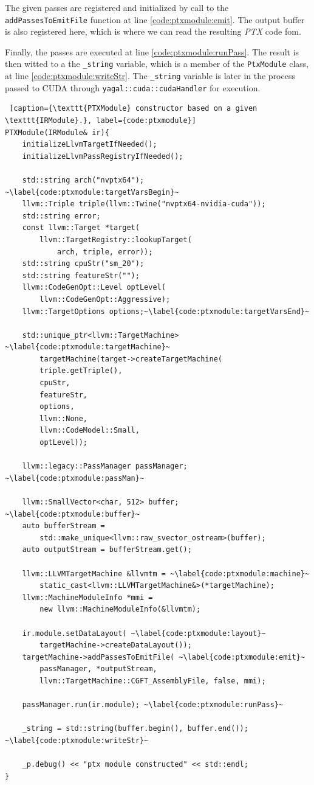The given passes are registered and initialized by call to the \texttt{addPassesToEmitFile} function at line \ref{code:ptxmodule:emit}. The output buffer is also registered here, which is where we can read the resulting \textit{PTX} code fom.

Finally, the passes are executed at line \ref{code:ptxmodule:runPass}. The result is then witted to a the \texttt{\_string} variable, which is a member of the \texttt{PtxModule} class, at line \ref{code:ptxmodule:writeStr}. The \texttt{\_string} variable is later in the process passed to CUDA through \texttt{yagal::cuda::cudaHandler} for execution.

\begin{lstlisting} [caption={\texttt{PTXModule} constructor based on a given \texttt{IRModule}.}, label={code:ptxmodule}]
PTXModule(IRModule& ir){
    initializeLlvmTargetIfNeeded();
    initializeLlvmPassRegistryIfNeeded();

    std::string arch("nvptx64"); ~\label{code:ptxmodule:targetVarsBegin}~
    llvm::Triple triple(llvm::Twine("nvptx64-nvidia-cuda"));
    std::string error;
    const llvm::Target *target(
        llvm::TargetRegistry::lookupTarget(
            arch, triple, error));
    std::string cpuStr("sm_20");
    std::string featureStr("");
    llvm::CodeGenOpt::Level optLevel(
        llvm::CodeGenOpt::Aggressive);
    llvm::TargetOptions options;~\label{code:ptxmodule:targetVarsEnd}~

    std::unique_ptr<llvm::TargetMachine> ~\label{code:ptxmodule:targetMachine}~
        targetMachine(target->createTargetMachine(
        triple.getTriple(), 
        cpuStr, 
        featureStr, 
        options, 
        llvm::None, 
        llvm::CodeModel::Small, 
        optLevel));

    llvm::legacy::PassManager passManager; ~\label{code:ptxmodule:passMan}~

    llvm::SmallVector<char, 512> buffer; ~\label{code:ptxmodule:buffer}~
    auto bufferStream = 
        std::make_unique<llvm::raw_svector_ostream>(buffer);
    auto outputStream = bufferStream.get();

    llvm::LLVMTargetMachine &llvmtm = ~\label{code:ptxmodule:machine}~
        static_cast<llvm::LLVMTargetMachine&>(*targetMachine);
    llvm::MachineModuleInfo *mmi = 
        new llvm::MachineModuleInfo(&llvmtm);

    ir.module.setDataLayout( ~\label{code:ptxmodule:layout}~
        targetMachine->createDataLayout());
    targetMachine->addPassesToEmitFile( ~\label{code:ptxmodule:emit}~
        passManager, *outputStream, 
        llvm::TargetMachine::CGFT_AssemblyFile, false, mmi);

    passManager.run(ir.module); ~\label{code:ptxmodule:runPass}~

    _string = std::string(buffer.begin(), buffer.end()); ~\label{code:ptxmodule:writeStr}~

    _p.debug() << "ptx module constructed" << std::endl;
}
\end{lstlisting}